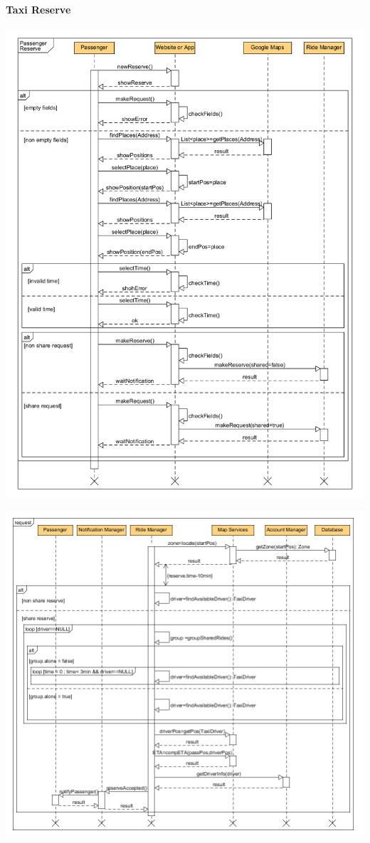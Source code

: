 \newpage
\paragraph{Taxi Reserve}
	\begin{center}
		\includegraphics[width=\textwidth]{diagrams/passengerReserve.png}
	\end{center}
	
	\begin{center}
		\includegraphics[width=\textwidth]{diagrams/serverReserve.png}
	\end{center}
